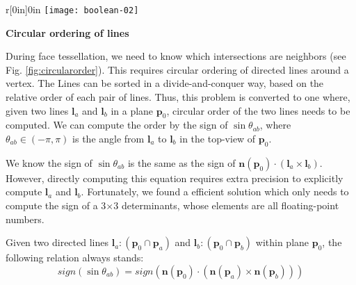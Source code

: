 \begin{wrapfigure}{r}[0in]{0in}
\texttt{[image: boolean-02]}
\end{wrapfigure}
\vspace{0.5em}
\noindent \textbf{Circular ordering of lines}~~~~

\noindent During face tessellation, we need to know which intersections are neighbors (see Fig. \ref{fig:circularorder}). This requires circular ordering of directed lines around a vertex. The Lines can be sorted in a divide-and-conquer way, based on the relative order of each pair of lines. Thus, this problem is converted to one where, given two lines $\bm{l}_a$ and $\bm{l}_b$ in a plane $\bm{p}_0$, circular order of the two lines needs to be computed.
We can compute the order by the sign of $\sin{\theta_{ab}}$, where $\theta_{ab}\in(-\pi,\pi)$ is the angle from $\bm{l}_a$ to $\bm{l}_b$ in the top-view of $\bm{p}_0$.

We know the sign of $\sin{\theta_{ab}}$ is the same as the sign of $\bm{n}(\bm{p}_0) \cdot (\bm{l}_a\times\bm{l}_b)$. However, directly computing this equation requires extra precision to explicitly compute $\bm{l}_a$ and $\bm{l}_b$. Fortunately, we found a efficient solution which only needs to compute the sign of a 3$\times$3 determinants, whose elements are all floating-point numbers.

\begin{theorem}
  \label{theorem1}
  Given two directed lines $\bm{l}_a\colon(\bm{p}_0\cap\bm{p}_a)$ and $\bm{l}_b\colon(\bm{p}_0\cap\bm{p}_b)$ within plane $\bm{p}_0$, the following relation always stands:
  \begin{equation}
    sign(\sin{\theta_{ab}})=  sign(\bm{n}(\bm{p}_0)\cdot(\bm{n}(\bm{p}_a) \times \bm{n}(\bm{p}_b)))
  \end{equation}
\end{theorem}

